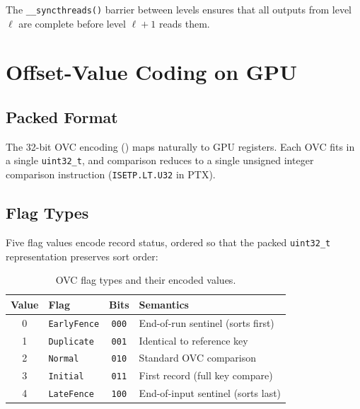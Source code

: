 \documentclass[conference,10pt]{IEEEtran}
\begin{document}
The \texttt{\_\_syncthreads()} barrier between levels ensures that all
outputs from level $\ell$ are complete before level $\ell{+}1$ reads them.


\section{Offset-Value Coding on GPU}
\label{sec:ovc}

\subsection{Packed Format}

The 32-bit OVC encoding () maps naturally to GPU
registers.  Each OVC fits in a single \texttt{uint32\_t}, and comparison
reduces to a single unsigned integer comparison instruction
(\texttt{ISETP.LT.U32} in PTX).

\subsection{Flag Types}

Five flag values encode record status, ordered so that the packed
\texttt{uint32\_t} representation preserves sort order:

\begin{table}[t]
  \centering
  \caption{OVC flag types and their encoded values.}
  \label{tab:ovc_flags}
  \begin{tabular}{@{}clcl@{}}
    \toprule
    \textbf{Value} & \textbf{Flag} & \textbf{Bits} & \textbf{Semantics} \\
    \midrule
    0 & \texttt{EarlyFence} & \texttt{000} & End-of-run sentinel (sorts first) \\
    1 & \texttt{Duplicate}  & \texttt{001} & Identical to reference key \\
    2 & \texttt{Normal}     & \texttt{010} & Standard OVC comparison \\
    3 & \texttt{Initial}    & \texttt{011} & First record (full key compare) \\
    4 & \texttt{LateFence}  & \texttt{100} & End-of-input sentinel (sorts last) \\
    \bottomrule
  \end{tabular}
\end{table}
\end{document}
